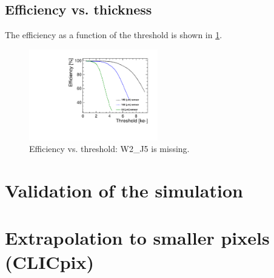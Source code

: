 \subsection{Efficiency vs. thickness}

The efficiency as a function of the threshold is shown in \cref{fig:efficiency_VS_Threshold}.

\begin{figure}[htbp] 
  \centering
  \includegraphics[width=0.5\textwidth]{./figures/TestBeam/Efficiency_vs_THL.pdf}
  \caption{Efficiency vs. threshold: W2\_J5 is missing.}
  \label{fig:efficiency_VS_Threshold}
\end{figure}


\section{Validation of the simulation}
\section{Extrapolation to smaller pixels (CLICpix)}



